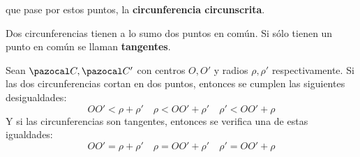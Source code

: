                                                                                                                                                                                                                                                                                                                                                                                                                                                                                                                                                                                                                                                                                                                                                                                                                                                                                                                                                                                                                                                                                                                                                                                                                                                                                                                                                                                                                                                                                                                                                                                                                                                                     que pase por estos puntos, la \textbf{circunferencia circunscrita}.

 Dos circunferencias tienen a lo sumo dos puntos en común. Si sólo tienen un punto en común se llaman \textbf{tangentes}.

\importante {} Sean $\C, \C'$ con centros $O, O'$ y radios $\rho, \rho'$ respectivamente. Si las dos circunferencias cortan en dos puntos, entonces se cumplen las siguientes desigualdades:
$$OO' < \rho+\rho' \quad \rho < OO'+\rho' \quad \rho' < OO' + \rho$$
Y si las circunferencias son tangentes, entonces se verifica una de estas igualdades:
$$OO' = \rho+\rho' \quad \rho = OO'+\rho' \quad \rho' =   OO' + \rho$$      

